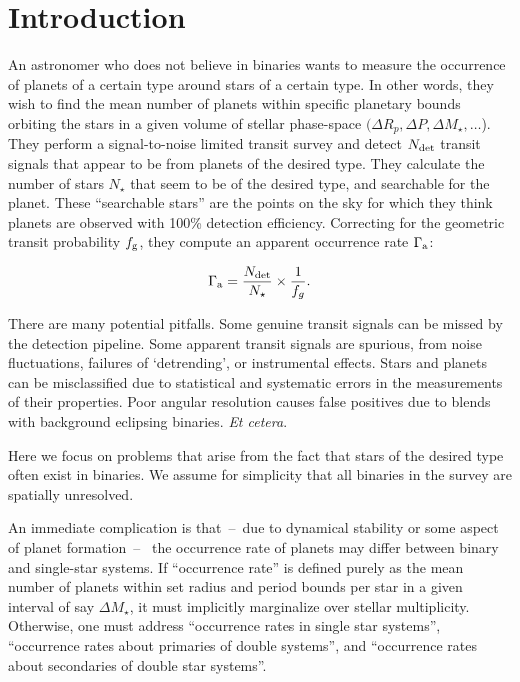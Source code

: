 \documentclass{emulateapj}
\begin{document}

\section{Introduction}

An astronomer who does not believe in binaries wants to measure the
occurrence of planets of a certain type around stars of a certain type.
In other words, they wish to find the mean number of planets within specific 
planetary bounds orbiting the stars in a given volume 
of stellar phase-space $(\Delta R_p, \Delta P, \Delta M_\star,\ldots$).
They perform a signal-to-noise limited transit survey and detect $N_{\rm det}$ 
transit signals that appear to be from planets of the desired type.  They 
calculate the number of stars $N_\star$ that seem to be of the desired type, 
and searchable for the planet.  These ``searchable stars'' are the points on 
the sky for which they think planets are observed with 100\% detection 
efficiency. Correcting for the geometric 
transit probability $f_{\rm g}$, they compute an apparent occurrence rate 
$\Gamma_{\rm a}$:

\begin{equation}
\Gamma_{\rm a} = \frac{N_{\rm det}}{N_\star} \times \frac{1}{f_g}.
\end{equation}

There are many potential pitfalls.  Some genuine transit signals can be missed
by the detection pipeline.  Some apparent transit signals are spurious, from
noise fluctuations, failures of `detrending', or instrumental effects.  Stars
and planets can be misclassified due to statistical and systematic errors in
the measurements of their properties.  Poor angular resolution causes false
positives due to blends with background eclipsing binaries. {\it Et cetera}.

Here we focus on problems that arise from the fact that stars of the desired
type often exist in binaries. 
We assume for simplicity that all binaries in the survey are 
spatially unresolved.

An immediate complication is that~--~due to dynamical stability or some 
aspect of planet formation~--~ the occurrence rate of planets may differ 
between binary and single-star systems.
If ``occurrence rate'' is defined purely as the mean number of planets within 
set radius and period bounds per star in a given interval of say $\Delta 
M_\star$, it must implicitly marginalize over stellar multiplicity.
Otherwise, one must address ``occurrence rates in single star systems'', 
``occurrence rates about primaries of double systems'', and
``occurrence rates about secondaries of double star systems''.
\end{document}
